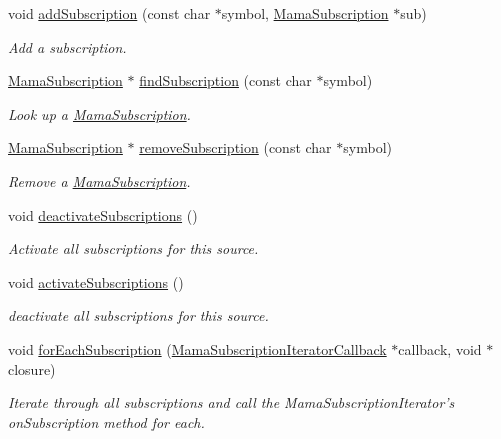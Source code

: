 \begin{DoxyCompactItemize}
void \hyperlink{classWombat_1_1MamaSource_ad1b8bce6e72f7c76da3015caa33db50e}{addSubscription} (const char $\ast$symbol, \hyperlink{classWombat_1_1MamaSubscription}{MamaSubscription} $\ast$sub)
\begin{DoxyCompactList}\small\item\em Add a subscription. \item\end{DoxyCompactList}\item 
\hyperlink{classWombat_1_1MamaSubscription}{MamaSubscription} $\ast$ \hyperlink{classWombat_1_1MamaSource_ae6971d65242d7fb6b3079e0c80fe6661}{findSubscription} (const char $\ast$symbol)
\begin{DoxyCompactList}\small\item\em Look up a \hyperlink{classWombat_1_1MamaSubscription}{MamaSubscription}. \item\end{DoxyCompactList}\item 
\hyperlink{classWombat_1_1MamaSubscription}{MamaSubscription} $\ast$ \hyperlink{classWombat_1_1MamaSource_ac1b23c0842fc58e12e9e7dabe72445e0}{removeSubscription} (const char $\ast$symbol)
\begin{DoxyCompactList}\small\item\em Remove a \hyperlink{classWombat_1_1MamaSubscription}{MamaSubscription}. \item\end{DoxyCompactList}\item 
void \hyperlink{classWombat_1_1MamaSource_a050dd41f5dcf8895205e99bab7a6cabc}{deactivateSubscriptions} ()
\begin{DoxyCompactList}\small\item\em Activate all subscriptions for this source. \item\end{DoxyCompactList}\item 
void \hyperlink{classWombat_1_1MamaSource_ae41795d8888a4f775ba67f5526359aaf}{activateSubscriptions} ()
\begin{DoxyCompactList}\small\item\em deactivate all subscriptions for this source. \item\end{DoxyCompactList}\item 
void \hyperlink{classWombat_1_1MamaSource_a22c2ffa8102399808dc20ef6b4517768}{forEachSubscription} (\hyperlink{classWombat_1_1MamaSubscriptionIteratorCallback}{MamaSubscriptionIteratorCallback} $\ast$callback, void $\ast$closure)
\begin{DoxyCompactList}\small\item\em Iterate through all subscriptions and call the MamaSubscriptionIterator's onSubscription method for each. \item\end{DoxyCompactList}\end{DoxyCompactItemize}


